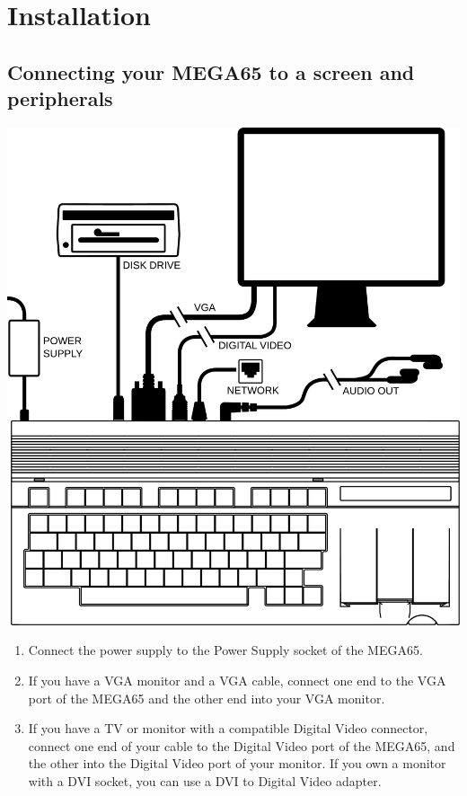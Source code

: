 \newpage

\section{Installation}

\subsection{Connecting your MEGA65 to a screen and peripherals}

\includegraphics[width=\linewidth]{images/illustrations/mega65-top.pdf}

\newpage

\begin{enumerate}
	\item Connect the power supply to the Power Supply socket of the MEGA65.
	\item If you have a VGA monitor and a VGA cable, connect one end to the VGA port of the MEGA65 and the other end into your VGA monitor.
	\item If you have a TV or monitor with a compatible Digital Video connector, connect one end of your cable to the Digital Video port of the MEGA65, and the other into the Digital Video port of your monitor. If you own a monitor with a DVI socket, you can use a DVI to Digital Video adapter.
\end{enumerate}

